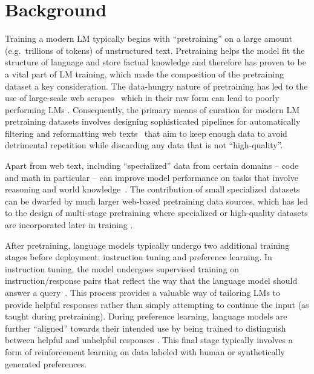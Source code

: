 \documentclass{article}
\theoremstyle{plain}
\theoremstyle{definition}
\theoremstyle{remark}
\begin{document}
\section{Background}
\vspace{-0.1cm} 
\label{sec:background}
Training a modern LM typically begins with ``pretraining'' on a large amount (e.g.\ trillions of tokens) of unstructured text.
Pretraining helps the model fit the structure of language \cite{clark2019does} and store factual knowledge \cite{petroni2019language,roberts2020much} and therefore has proven to be a vital part of LM training, which made the composition of the pretraining dataset a key consideration.
The data-hungry nature of pretraining has led to the use of large-scale web scrapes~\cite{commoncrawl,openai_gptbot,anthropic_claudebot} which in their raw form can lead to poorly performing LMs \cite{penedo2024refinedweb}.
Consequently, the primary means of curation for modern LM pretraining datasets involves designing sophisticated pipelines for automatically filtering and reformatting web texts~\cite{Penedo2024TheFD,penedo2024refinedweb,soldaini2024dolma,cerebras2023slimpajama,li2024datacomp} that aim to keep enough data to avoid detrimental repetition \cite{muennighoff2023scaling} while discarding any data that is not ``high-quality''.

Apart from web text, including ``specialized'' data from certain domains -- code \cite{kocetkov2022stack,li2023starcoder} and math \cite{paster2023openwebmath,han2024infimm,wangmathpile,azerbayev2023llemma} in particular -- can improve model performance on tasks that involve reasoning and world knowledge~\cite{muennighoff2023scaling,aryabumi2024code,lewkowycz2022solving,shao2024deepseekmath}.
The contribution of small specialized datasets can be dwarfed by much larger web-based pretraining data sources, which has led to the design of multi-stage pretraining where specialized or high-quality datasets are incorporated later in training \cite{abdin2024phi,olmo2_2024,blakeney2024does,singer2024h2o}.

After pretraining, language models typically undergo two additional training stages before deployment: instruction tuning and preference learning.
In instruction tuning, the model undergoes supervised training on instruction/response pairs that reflect the way that the language model should answer a query~\cite{wei2021finetuned,mishra2021cross,sanh2021multitask,wang2022self}.
This process provides a valuable way of tailoring LMs to provide helpful responses rather than simply attempting to continue the input (as taught during pretraining).
During preference learning, language models are further ``aligned'' towards their intended use by being trained to distinguish between helpful and unhelpful responses \cite{ouyang2022training,bai2022constitutional}.
This final stage typically involves a form of reinforcement learning \cite{bai2022constitutional,leerlaif,rafailov2024direct} on data labeled with human or synthetically generated preferences.
\end{document}
